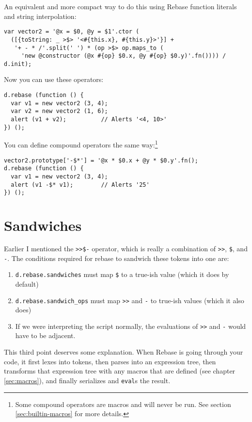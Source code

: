 \documentclass{report}
\begin{document}
      An equivalent and more compact way to do this using Rebase function literals and string interpolation:

\begin{verbatim}
var vector2 = '@x = $0, @y = $1'.ctor (
  ([{toString: _ >$> '<#{this.x}, #{this.y}>'}] +
   '+ - * /'.split(' ') * (op >$> op.maps_to (
     'new @constructor (@x #{op} $0.x, @y #{op} $0.y)'.fn()))) / d.init);
\end{verbatim}

      Now you can use these operators:

\begin{verbatim}
d.rebase (function () {
  var v1 = new vector2 (3, 4);
  var v2 = new vector2 (1, 6);
  alert (v1 + v2);          // Alerts '<4, 10>'
}) ();
\end{verbatim}

      You can define compound operators the same way:\footnote{Some compound operators are macros and will never be run. See section \ref{sec:builtin-macros} for more details.}

\begin{verbatim}
vector2.prototype['-$*'] = '@x * $0.x + @y * $0.y'.fn();
d.rebase (function () {
  var v1 = new vector2 (3, 4);
  alert (v1 -$* v1);        // Alerts '25'
}) ();
\end{verbatim}

\section {Sandwiches}
      \label{sec:sandwiches}
      Earlier I mentioned the \verb|>>$-| operator, which is really a combination of \verb|>>|, \verb|$|, and \verb|-|. The conditions required for rebase to sandwich these tokens into one
      are:

\begin{enumerate}
\item \verb|d.rebase.sandwiches| must map \verb|$| to a true-ish value (which it does by default)
\item \verb|d.rebase.sandwich_ops| must map \verb|>>| and \verb|-| to true-ish values (which it also does)
\item If we were interpreting the script normally, the evaluations of \verb|>>| and \verb|-| would have to be adjacent.
\end{enumerate}

      This third point deserves some explanation. When Rebase is going through your code, it first lexes into tokens, then parses into an expression tree, then transforms that expression tree
      with any macros that are defined (see chapter \ref{sec:macros}), and finally serializes and \verb|eval|s the result.
\end{document}
